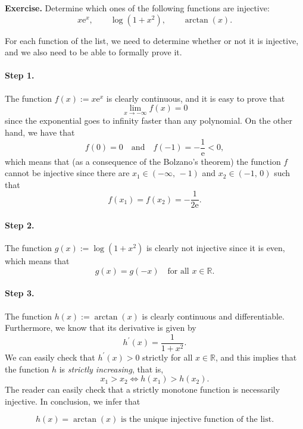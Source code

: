 \documentclass[a4paper,10 pt]{report}
\newcommand{\finalanswer}[1]{%
    \begin{finalAnswer}
    \[
        #1
    \]
    \end{finalAnswer}
}
\theoremstyle{definition}
\newcommand{\R}{\mathbb R}
\begin{document}
\begin{exerciseBox} \textbf{Exercise.} Determine which ones of the following functions are injective:
\begin{equation*} x \mathrm{e}^x, \qquad \log(1 + x^2), \qquad \arctan(x). \end{equation*}
\end{exerciseBox}

\begin{solutionBox} For each function of the list, we need to determine whether or not it is injective, and we also need to be able to formally prove it.

\paragraph{Step 1.} The function $f(x) := x \mathrm{e}^x$ is clearly continuous, and it is easy to prove that
\begin{equation*} \lim_{x \to - \infty} f(x) = 0 \end{equation*}
since the exponential goes to infinity faster than any polynomial. On the other hand, we have that
\begin{equation*} f(0) = 0 \quad \text{and} \quad f(-1) = - \frac{1}{\mathrm{e}} < 0, \end{equation*}
which means that (as a consequence of the Bolzano's theorem) the function $f$ cannot be injective since there are $x_1 \in (- \infty, \, -1)$ and $x_2 \in (-1, \, 0)$ such that
\begin{equation*} f(x_1) = f(x_2) = - \frac{1}{2\mathrm{e}}. \end{equation*}

\paragraph{Step 2.} The function $g(x) := \log(1 + x^2)$ is clearly not injective since it is even, which means that
\begin{equation*} g(x) = g(-x) \quad \text{for all $x \in \R$}.\end{equation*}

\paragraph{Step 3.} The function $h(x) := \arctan(x)$ is clearly continuous and differentiable. Furthermore, we know that its derivative is given by
\begin{equation*} h^\prime(x) = \frac{1}{1 + x^2}. \end{equation*}
We can easily check that $h^\prime(x) > 0$ strictly for all $x \in \R$, and this implies that the function $h$ is \textit{strictly increasing}, that is,
\begin{equation*}x_1 > x_2 \iff h(x_1) > h(x_2). \end{equation*}
The reader can easily check that a strictly monotone function is necessarily injective. In conclusion, we infer that
\finalanswer{
  \text{$h(x) = \arctan(x)$ is the unique injective function of the list.}
} \end{solutionBox}
\end{document}
